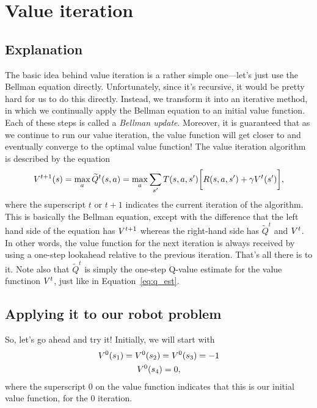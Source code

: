 \documentclass[a4paper]{article}
\begin{document}
\section{Value iteration}
\subsection{Explanation}
The basic idea behind value iteration is a rather simple one---let's just use
the Bellman equation directly.
Unfortunately, since it's recursive, it would be pretty hard for us to do
this directly.
Instead, we transform it into an iterative method, in which we continually
apply the Bellman equation to an initial value function.
Each of these steps is called a \emph{Bellman update}.
Moreover, it is guaranteed that as we continue to run our value iteration,
the value function will get closer to and eventually converge to the
optimal value function!
The value iteration algorithm is described by the equation
\begin{equation} \label{eq:val_it}
  V^{t+1}(s) = \operatorname*{max}_a \widetilde{Q}^t(s, a) = \operatorname*{max}_a \sum_{s'} T(s, a, s') \bigg[ R(s, a, s') + \gamma V^t(s') \bigg] ,
\end{equation}
where the superscript $t$ or $t+1$ indicates the current iteration of the
algorithm.
This is basically the Bellman equation, except with the difference that the
left hand side of the equation has $V^{t+1}$ whereas the right-hand side
has $\widetilde{Q}^t$ and $V^t$.
In other words, the value function for the next iteration is always received
by using a one-step lookahead relative to the previous iteration.
That's all there is to it.
Note also that $\widetilde{Q}^t$ is simply the one-step Q-value estimate
for the value functinon $V^t$, just like in Equation~\ref{eq:q_est}.

\subsection{Applying it to our robot problem}
So, let's go ahead and try it!
Initially, we will start with
\begin{gather*}
  V^0(s_1) = V^0(s_2) = V^0(s_3) = -1 \\
  V^0(s_4) = 0 ,
\end{gather*}
where the superscript 0 on the value function indicates that this is
our initial value function, for the 0 iteration.
\end{document}
